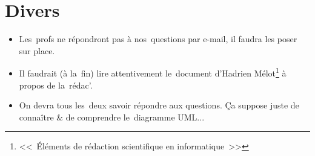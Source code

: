 \section{Divers}
\begin{itemize}
	\item Les~profs ne répondront pas à nos~questions par e-mail, il faudra les poser sur place.
	\item Il faudrait (à la~fin) lire attentivement le~document d'Hadrien Mélot\footnote{<<~Éléments de rédaction scientifique en informatique~>>} à propos de la~rédac'.
	\item On devra tous les~deux savoir répondre aux questions. Ça suppose juste de connaître \& de comprendre le~diagramme UML...
\end{itemize}
